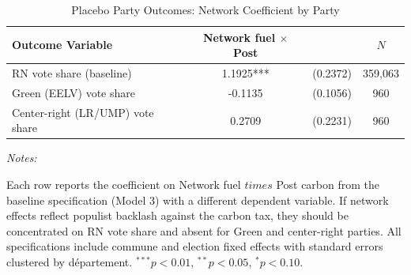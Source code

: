 \begin{table}[!h]
\centering
\caption{Placebo Party Outcomes: Network Coefficient by Party}
\centering
\fontsize{10}{12}\selectfont
\begin{threeparttable}
\begin{tabular}[t]{lccc}
\toprule
Outcome Variable & Network fuel $\times$ Post &  & $N$\\
\midrule
RN vote share (baseline) & 1.1925*** & (0.2372) & 359,063\\
Green (EELV) vote share & -0.1135 & (0.1056) & 960\\
Center-right (LR/UMP) vote share & 0.2709 & (0.2231) & 960\\
\bottomrule
\end{tabular}
\begin{tablenotes}
\item \textit{Notes:} 
\item Each row reports the coefficient on Network fuel $times$ Post carbon from the baseline specification (Model 3) with a different dependent variable. If network effects reflect populist backlash against the carbon tax, they should be concentrated on RN vote share and absent for Green and center-right parties. All specifications include commune and election fixed effects with standard errors clustered by d\'{e}partement. $^{***}p<0.01$, $^{**}p<0.05$, $^{*}p<0.10$.
\end{tablenotes}
\end{threeparttable}
\end{table}
